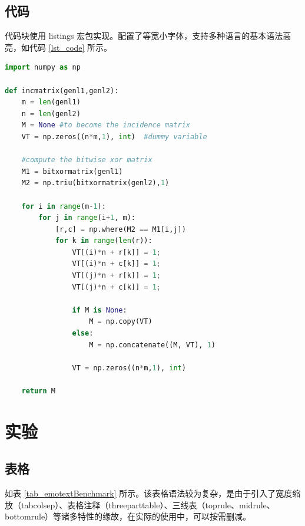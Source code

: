 \documentclass[12]{ctexart}
\begin{document}
\subsection{代码}

代码块使用 listings 宏包\cite{listings}实现。配置了等宽小字体，支持多种语言的基本语法高亮，如代码 \ref{lst_code} 所示。

\begin{lstlisting}[language=Python, caption={Python example}, label={lst_code}]
import numpy as np
    
def incmatrix(genl1,genl2):
    m = len(genl1)
    n = len(genl2)
    M = None #to become the incidence matrix
    VT = np.zeros((n*m,1), int)  #dummy variable
    
    #compute the bitwise xor matrix
    M1 = bitxormatrix(genl1)
    M2 = np.triu(bitxormatrix(genl2),1) 

    for i in range(m-1):
        for j in range(i+1, m):
            [r,c] = np.where(M2 == M1[i,j])
            for k in range(len(r)):
                VT[(i)*n + r[k]] = 1;
                VT[(i)*n + c[k]] = 1;
                VT[(j)*n + r[k]] = 1;
                VT[(j)*n + c[k]] = 1;
                
                if M is None:
                    M = np.copy(VT)
                else:
                    M = np.concatenate((M, VT), 1)
                
                VT = np.zeros((n*m,1), int)
    
    return M
\end{lstlisting}

\section{实验}

\subsection{表格}

如表 \ref{tab_emotextBenchmark} 所示。该表格语法较为复杂，是由于引入了宽度缩放（tabcolsep）、表格注释（threeparttable）、三线表（toprule、midrule、bottomrule）等诸多特性的缘故，在实际的使用中，可以按需删减。
\end{document}
